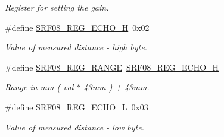 \begin{DoxyCompactItemize}
\begin{DoxyCompactList}\small\item\em \-Register for setting the gain. \end{DoxyCompactList}\item 
\hypertarget{group___s_r_f08___r_e_g_i_s_t_e_r_s_ga852b7411dc4146e15021b5a03ee568b0}{\#define \hyperlink{group___s_r_f08___r_e_g_i_s_t_e_r_s_ga852b7411dc4146e15021b5a03ee568b0}{\-S\-R\-F08\-\_\-\-R\-E\-G\-\_\-\-E\-C\-H\-O\-\_\-\-H}~0x02}\label{group___s_r_f08___r_e_g_i_s_t_e_r_s_ga852b7411dc4146e15021b5a03ee568b0}

\begin{DoxyCompactList}\small\item\em \-Value of measured distance -\/ high byte. \end{DoxyCompactList}\item 
\hypertarget{group___s_r_f08___r_e_g_i_s_t_e_r_s_gad1933d946b6b16efaab6206c5f4fabb3}{\#define \hyperlink{group___s_r_f08___r_e_g_i_s_t_e_r_s_gad1933d946b6b16efaab6206c5f4fabb3}{\-S\-R\-F08\-\_\-\-R\-E\-G\-\_\-\-R\-A\-N\-G\-E}~\hyperlink{group___s_r_f08___r_e_g_i_s_t_e_r_s_ga852b7411dc4146e15021b5a03ee568b0}{\-S\-R\-F08\-\_\-\-R\-E\-G\-\_\-\-E\-C\-H\-O\-\_\-\-H}}\label{group___s_r_f08___r_e_g_i_s_t_e_r_s_gad1933d946b6b16efaab6206c5f4fabb3}

\begin{DoxyCompactList}\small\item\em \-Range in mm ( val $\ast$ 43mm ) + 43mm. \end{DoxyCompactList}\item 
\hypertarget{group___s_r_f08___r_e_g_i_s_t_e_r_s_gaf59fa043fa146779d9a0aa02a2d214df}{\#define \hyperlink{group___s_r_f08___r_e_g_i_s_t_e_r_s_gaf59fa043fa146779d9a0aa02a2d214df}{\-S\-R\-F08\-\_\-\-R\-E\-G\-\_\-\-E\-C\-H\-O\-\_\-\-L}~0x03}\label{group___s_r_f08___r_e_g_i_s_t_e_r_s_gaf59fa043fa146779d9a0aa02a2d214df}

\begin{DoxyCompactList}\small\item\em \-Value of measured distance -\/ low byte. \end{DoxyCompactList}\end{DoxyCompactItemize}
